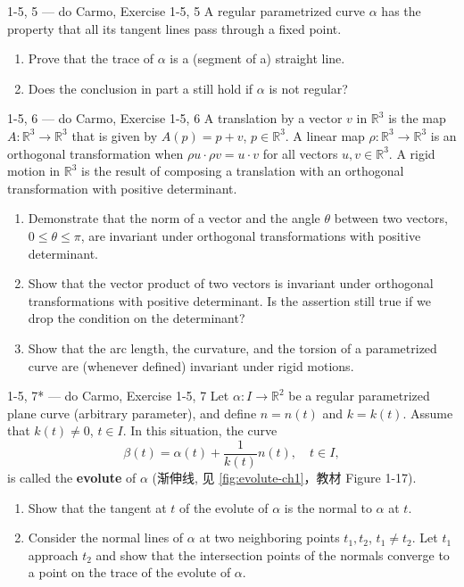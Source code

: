 \begin{exercise}{1-5, 5 — do Carmo, Exercise 1-5, 5}
A regular parametrized curve $\alpha$ has the property that all its tangent lines pass through a fixed point.
\begin{enumerate}
\item[a.] Prove that the trace of $\alpha$ is a (segment of a) straight line.
\item[b.] Does the conclusion in part a still hold if $\alpha$ is not regular?
\end{enumerate}
\end{exercise}

\begin{exercise}{1-5, 6 — do Carmo, Exercise 1-5, 6}
A translation by a vector $v$ in $\mathbb{R}^3$ is the map $A: \mathbb{R}^3 \to \mathbb{R}^3$ that is given by $A(p) = p + v$, $p \in \mathbb{R}^3$. A linear map $\rho: \mathbb{R}^3 \to \mathbb{R}^3$ is an orthogonal transformation when $\rho u \cdot \rho v = u \cdot v$ for all vectors $u, v \in \mathbb{R}^3$. A rigid motion in $\mathbb{R}^3$ is the result of composing a translation with an orthogonal transformation with positive determinant.
\begin{enumerate}
\item[a.] Demonstrate that the norm of a vector and the angle $\theta$ between two vectors, $0 \leq \theta \leq \pi$, are invariant under orthogonal transformations with positive determinant.
\item[b.] Show that the vector product of two vectors is invariant under orthogonal transformations with positive determinant. Is the assertion still true if we drop the condition on the determinant?
\item[c.] Show that the arc length, the curvature, and the torsion of a parametrized curve are (whenever defined) invariant under rigid motions.
\end{enumerate}
\end{exercise}

\begin{exercise}{1-5, 7* — do Carmo, Exercise 1-5, 7}
Let $\alpha: I \to \mathbb{R}^2$ be a regular parametrized plane curve (arbitrary parameter), and define $n = n(t)$ and $k = k(t)$. Assume that $k(t) \neq 0$, $t \in I$. In this situation, the curve
\[
\beta(t) = \alpha(t) + \frac{1}{k(t)} n(t), \quad t \in I,
\]
is called the \textbf{evolute} of $\alpha$ (渐伸线, 见 \cref{fig:evolute-ch1}，教材 Figure 1-17).
\begin{enumerate}
\item[a.] Show that the tangent at $t$ of the evolute of $\alpha$ is the normal to $\alpha$ at $t$.
\item[b.] Consider the normal lines of $\alpha$ at two neighboring points $t_1, t_2$, $t_1 \neq t_2$. Let $t_1$ approach $t_2$ and show that the intersection points of the normals converge to a point on the trace of the evolute of $\alpha$.
\end{enumerate}
\end{exercise}

